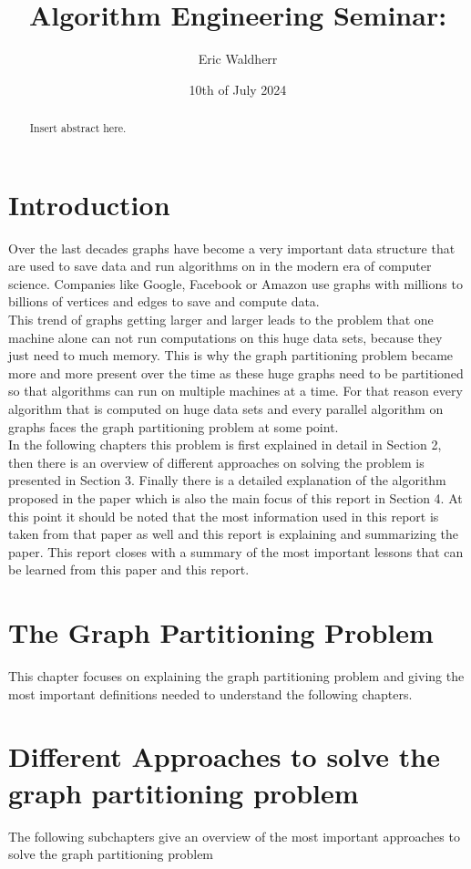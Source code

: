 \documentclass[acmsmall,nonacm,screen,review]{acmart}
\title{Algorithm Engineering Seminar: }
\author{Eric Waldherr}
\affiliation{%
  \institution{Heidelberg University}
  \streetaddress{Im Neuenheimer Feld 205}
  \city{Heidelberg}
  \state{Baden-Württemberg}
  \country{Germany}
  \postcode{69120}
}
\date{10th of July 2024}
\begin{document}
\begin{abstract}
Insert abstract here.
\end{abstract}
\maketitle

\section{Introduction}
Over the last decades graphs have become a very important data structure that are used to save data
and run algorithms on in the modern era of computer science. Companies like Google, Facebook or Amazon use graphs with millions to billions of vertices and edges to save and compute data.\\ 
This trend of graphs getting larger and larger leads to the problem that one machine alone can not run computations on this huge data sets, because they just need to much memory. This is why the graph partitioning problem became more and more present over the time as these huge graphs need to be partitioned so that algorithms can run on multiple machines at a time. For that reason every algorithm that is computed on huge data sets and every parallel algorithm on graphs faces the graph partitioning problem at some point.\\ 
In the following chapters this problem is first explained in detail in Section 2, then there is an overview of different approaches on solving the problem is presented in Section 3. Finally there is a detailed explanation of the algorithm proposed in the paper which is also the main focus of this report in Section 4. At this point it should be noted that the most information used in this report is taken from that paper as well and this report is explaining and summarizing the paper. This report closes with a summary of the most important lessons that can be learned from this paper and this report.
\section{The Graph Partitioning Problem}
This chapter focuses on explaining the graph partitioning problem and giving the most important definitions needed to understand the following chapters.\\
\section{Different Approaches to solve the graph partitioning problem}
The following subchapters give an overview of the most important approaches to solve the graph partitioning problem
\end{document}

